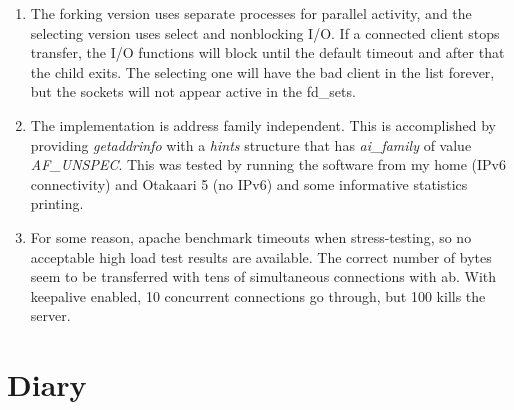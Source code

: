 \documentclass[a4paper,12pt]{article}
\begin{document}
\begin{enumerate}
\item The forking version uses separate processes for parallel activity, and the selecting version uses select and nonblocking I/O. If a connected client stops transfer, the I/O functions will block until the default timeout and after that the child exits. The selecting one will have the bad client in the list forever, but the sockets will not appear active in the fd\_sets.
\item The implementation is address family independent. This is accomplished by providing \emph{getaddrinfo} with a \emph{hints} structure that has \emph{ai\_family} of value \emph{AF\_UNSPEC}. This was tested by running the software from my home (IPv6 connectivity) and Otakaari 5 (no IPv6) and some informative statistics printing.
\item For some reason, apache benchmark timeouts when stress-testing, so no acceptable high load test results are available. The correct number of bytes seem to be transferred with tens of simultaneous connections with ab. With keepalive enabled, 10 concurrent connections go through, but 100 kills the server.
\end{enumerate}

\section{Diary}
\end{document}
